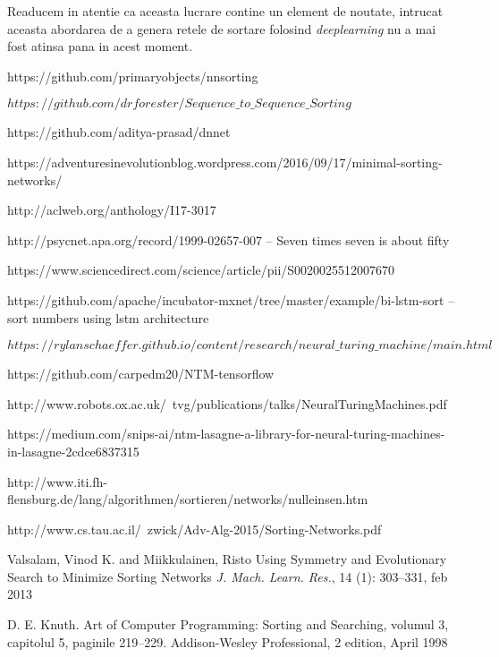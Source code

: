 \documentclass[12pt]{article}
\begin{document}
Readucem in atentie ca aceasta lucrare contine un element de noutate, intrucat aceasta abordarea de a genera retele de sortare folosind \textit{deeplearning} nu a mai fost atinsa pana in acest moment. 
  
 


\pagebreak
\begin{thebibliography}{12}
 https://github.com/primaryobjects/nnsorting

$https://github.com/drforester/Sequence\_to\_Sequence\_Sorting$

 https://github.com/aditya-prasad/dnnet

 https://adventuresinevolutionblog.wordpress.com/2016/09/17/minimal-sorting-networks/

 http://aclweb.org/anthology/I17-3017


 http://psycnet.apa.org/record/1999-02657-007 -- Seven times seven is about fifty

 https://www.sciencedirect.com/science/article/pii/S0020025512007670

 https://github.com/apache/incubator-mxnet/tree/master/example/bi-lstm-sort -- sort numbers using lstm architecture 

 $https://rylanschaeffer.github.io/content/research/neural\_turing\_machine/main.html$

 https://github.com/carpedm20/NTM-tensorflow

 http://www.robots.ox.ac.uk/~tvg/publications/talks/NeuralTuringMachines.pdf

 https://medium.com/snips-ai/ntm-lasagne-a-library-for-neural-turing-machines-in-lasagne-2cdce6837315

 http://www.iti.fh-flensburg.de/lang/algorithmen/sortieren/networks/nulleinsen.htm

 http://www.cs.tau.ac.il/~zwick/Adv-Alg-2015/Sorting-Networks.pdf

 Valsalam, Vinod K. and Miikkulainen, Risto
 \newblock Using Symmetry and Evolutionary Search to Minimize Sorting Networks
 \newblock \emph{J. Mach. Learn. Res.}, 14 (1):  303--331, feb 2013

 D. E. Knuth. Art of Computer Programming: Sorting and Searching, volumul 3, capitolul 5, paginile
 219–229. Addison-Wesley Professional, 2 edition, April 1998


\end{thebibliography}
\end{document}
